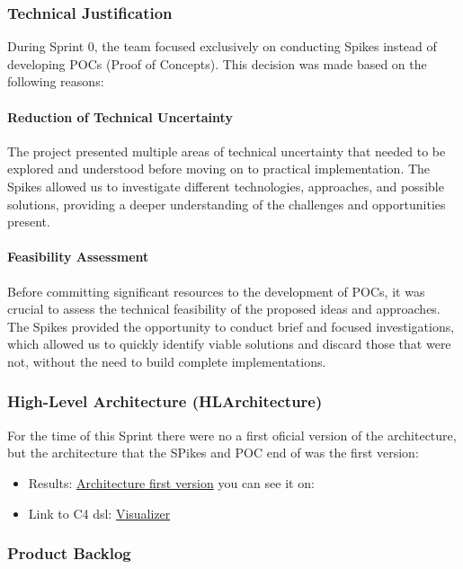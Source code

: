 \subsubsection{Technical Justification}

During Sprint 0, the team focused exclusively on conducting Spikes instead of developing POCs (Proof of Concepts). This decision was made based on the following reasons:

\paragraph{Reduction of Technical Uncertainty}
The project presented multiple areas of technical uncertainty that needed to be explored and understood before moving on to practical implementation. The Spikes allowed us to investigate different technologies, approaches, and possible solutions, providing a deeper understanding of the challenges and opportunities present.

\paragraph{Feasibility Assessment}
Before committing significant resources to the development of POCs, it was crucial to assess the technical feasibility of the proposed ideas and approaches. The Spikes provided the opportunity to conduct brief and focused investigations, which allowed us to quickly identify viable solutions and discard those that were not, without the need to build complete implementations.


\subsubsection{High-Level Architecture (HLArchitecture)}
For the time of this Sprint there were no a first oficial version of the architecture, but the architecture that the SPikes and POC end of was the first version:
\begin{itemize}
\item Results: \href{https://github.com/Pending-Name-21/arquitecture/pull/1/files}{Architecture first version}
you can see it on: 
\item Link to C4 dsl: \href{https://structurizr.com/dsl}{Visualizer}
\end{itemize}
\newpage
\subsubsection{Product Backlog}

